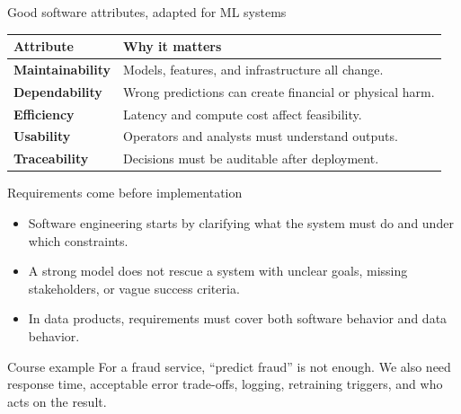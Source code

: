 \begin{frame}{Good software attributes, adapted for ML systems}
\begin{tabularx}{\textwidth}{>{\bfseries}l X}
Attribute & Why it matters \\
\toprule
Maintainability & Models, features, and infrastructure all change. \\
Dependability & Wrong predictions can create financial or physical harm. \\
Efficiency & Latency and compute cost affect feasibility. \\
Usability & Operators and analysts must understand outputs. \\
Traceability & Decisions must be auditable after deployment. \\
\bottomrule
\end{tabularx}
\coursefooter
\end{frame}

\begin{frame}{Requirements come before implementation}
\begin{itemize}
\item Software engineering starts by clarifying what the system must do and under which constraints.
\item A strong model does not rescue a system with unclear goals, missing stakeholders, or vague success criteria.
\item In data products, requirements must cover both software behavior and data behavior.
\end{itemize}
\begin{block}{Course example}
For a fraud service, ``predict fraud'' is not enough. We also need response time, acceptable error trade-offs, logging, retraining triggers, and who acts on the result.
\end{block}
\coursefooter
\end{frame}

